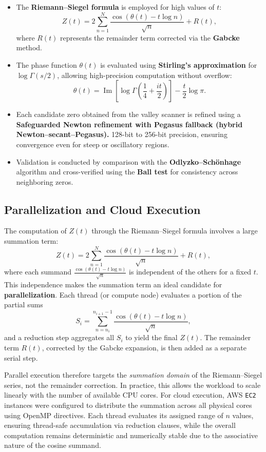 \documentclass[11pt,a4paper]{article}
\begin{document}
\begin{itemize}
    \item The \textbf{Riemann–Siegel formula} is employed for high values of \( t \):
    \[
        Z(t) = 2 \sum_{n=1}^{N} \frac{\cos(\theta(t) - t \log n)}{\sqrt{n}} + R(t),
    \]
    where \( R(t) \) represents the remainder term corrected via the \textbf{Gabcke} method.
    \item The phase function \( \theta(t) \) is evaluated using \textbf{Stirling’s approximation} for \(\log \Gamma(s/2)\), allowing high-precision computation without overflow:
    \[
        \theta(t) = \operatorname{Im}\left[\log \Gamma\left(\frac{1}{4} + \frac{it}{2}\right)\right] - \frac{t}{2} \log \pi.
    \]
    \item Each candidate zero obtained from the valley scanner is refined using a \textbf{Safeguarded Newton refinement with Pegasus fallback (hybrid Newton–secant–Pegasus).} 128-bit to 256-bit precision, ensuring convergence even for steep or oscillatory regions.
    \item Validation is conducted by comparison with the \textbf{Odlyzko–Schönhage} algorithm and cross-verified using the \textbf{Ball test} for consistency across neighboring zeros.
\end{itemize}

\subsection{Parallelization and Cloud Execution}
The computation of \( Z(t) \) through the Riemann--Siegel formula involves a large summation term:
\[
    Z(t) = 2 \sum_{n=1}^{N} \frac{\cos(\theta(t) - t \log n)}{\sqrt{n}} + R(t),
\]
where each summand
\(
    \frac{\cos(\theta(t) - t \log n)}{\sqrt{n}}
\)
is independent of the others for a fixed \( t \).
This independence makes the summation term an ideal candidate for \textbf{parallelization}.
Each thread (or compute node) evaluates a portion of the partial sums
\[
    S_i = \sum_{n = n_i}^{n_{i+1}-1} \frac{\cos(\theta(t) - t \log n)}{\sqrt{n}},
\]
and a reduction step aggregates all \( S_i \) to yield the final \( Z(t) \).
The remainder term \( R(t) \), corrected by the Gabcke expansion, is then added as a separate serial step.

Parallel execution therefore targets the \emph{summation domain} of the Riemann--Siegel series, not the remainder correction.
In practice, this allows the workload to scale linearly with the number of available CPU cores.
For cloud execution, AWS \texttt{EC2} instances were configured to distribute the summation across all physical cores using OpenMP directives.
Each thread evaluates its assigned range of \( n \) values, ensuring thread-safe accumulation via reduction clauses, while
the overall computation remains deterministic and numerically stable due to the associative nature of the cosine summand.
\end{document}
